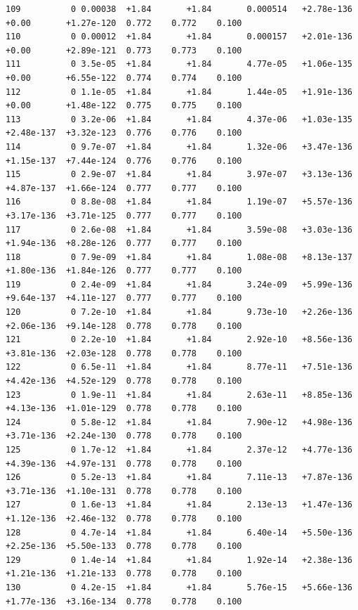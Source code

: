 \documentclass[12pt]{article}
\numberwithin{equation}{section}
\begin{document}
\begin{lstlisting}
109          0 0.00038  +1.84       +1.84       0.000514   +2.78e-136  +0.00       +1.27e-120  0.772    0.772    0.100
110          0 0.00012  +1.84       +1.84       0.000157   +2.01e-136  +0.00       +2.89e-121  0.773    0.773    0.100
111          0 3.5e-05  +1.84       +1.84       4.77e-05   +1.06e-135  +0.00       +6.55e-122  0.774    0.774    0.100
112          0 1.1e-05  +1.84       +1.84       1.44e-05   +1.91e-136  +0.00       +1.48e-122  0.775    0.775    0.100
113          0 3.2e-06  +1.84       +1.84       4.37e-06   +1.03e-135  +2.48e-137  +3.32e-123  0.776    0.776    0.100
114          0 9.7e-07  +1.84       +1.84       1.32e-06   +3.47e-136  +1.15e-137  +7.44e-124  0.776    0.776    0.100
115          0 2.9e-07  +1.84       +1.84       3.97e-07   +3.13e-136  +4.87e-137  +1.66e-124  0.777    0.777    0.100
116          0 8.8e-08  +1.84       +1.84       1.19e-07   +5.57e-136  +3.17e-136  +3.71e-125  0.777    0.777    0.100
117          0 2.6e-08  +1.84       +1.84       3.59e-08   +3.03e-136  +1.94e-136  +8.28e-126  0.777    0.777    0.100
118          0 7.9e-09  +1.84       +1.84       1.08e-08   +8.13e-137  +1.80e-136  +1.84e-126  0.777    0.777    0.100
119          0 2.4e-09  +1.84       +1.84       3.24e-09   +5.99e-136  +9.64e-137  +4.11e-127  0.777    0.777    0.100
120          0 7.2e-10  +1.84       +1.84       9.73e-10   +2.26e-136  +2.06e-136  +9.14e-128  0.778    0.778    0.100
121          0 2.2e-10  +1.84       +1.84       2.92e-10   +8.56e-136  +3.81e-136  +2.03e-128  0.778    0.778    0.100
122          0 6.5e-11  +1.84       +1.84       8.77e-11   +7.51e-136  +4.42e-136  +4.52e-129  0.778    0.778    0.100
123          0 1.9e-11  +1.84       +1.84       2.63e-11   +8.85e-136  +4.13e-136  +1.01e-129  0.778    0.778    0.100
124          0 5.8e-12  +1.84       +1.84       7.90e-12   +4.98e-136  +3.71e-136  +2.24e-130  0.778    0.778    0.100
125          0 1.7e-12  +1.84       +1.84       2.37e-12   +4.77e-136  +4.39e-136  +4.97e-131  0.778    0.778    0.100
126          0 5.2e-13  +1.84       +1.84       7.11e-13   +7.87e-136  +3.71e-136  +1.10e-131  0.778    0.778    0.100
127          0 1.6e-13  +1.84       +1.84       2.13e-13   +1.47e-136  +1.12e-136  +2.46e-132  0.778    0.778    0.100
128          0 4.7e-14  +1.84       +1.84       6.40e-14   +5.50e-136  +2.25e-136  +5.50e-133  0.778    0.778    0.100
129          0 1.4e-14  +1.84       +1.84       1.92e-14   +2.38e-136  +1.21e-136  +1.21e-133  0.778    0.778    0.100
130          0 4.2e-15  +1.84       +1.84       5.76e-15   +5.66e-136  +1.77e-136  +3.16e-134  0.778    0.778    0.100

\end{lstlisting}
\end{document}
